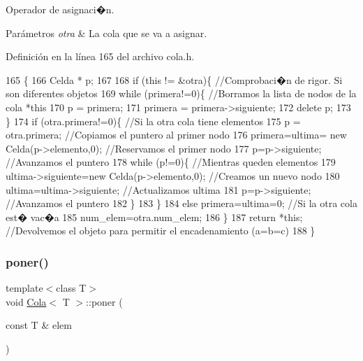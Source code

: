 Operador de asignaci�n. 


\begin{DoxyParams}{Parámetros}
{\em otra} & La cola que se va a asignar. \\
\hline
\end{DoxyParams}


Definición en la línea 165 del archivo cola.\+h.


\begin{DoxyCode}
165                                                \{
166   Celda * p;
167   
168   \textcolor{keywordflow}{if} (\textcolor{keyword}{this} != &otra)\{    \textcolor{comment}{//Comprobaci�n de rigor. Si son diferentes objetos}
169     \textcolor{keywordflow}{while} (primera!=0)\{  \textcolor{comment}{//Borramos la lista de nodos de la cola *this}
170       p = primera;
171       primera = primera->siguiente;
172       \textcolor{keyword}{delete} p;
173     \}
174     \textcolor{keywordflow}{if} (otra.primera!=0)\{        \textcolor{comment}{//Si la otra cola tiene elementos}
175       p = otra.primera;          \textcolor{comment}{//Copiamos el puntero al primer nodo}
176       primera=ultima= \textcolor{keyword}{new} Celda(p->elemento,0); \textcolor{comment}{//Reservamos el primer nodo}
177       p=p->siguiente;                           \textcolor{comment}{//Avanzamos el puntero}
178       \textcolor{keywordflow}{while} (p!=0)\{                             \textcolor{comment}{//Mientras queden elementos}
179         ultima->siguiente=\textcolor{keyword}{new} Celda(p->elemento,0); \textcolor{comment}{//Creamos un nuevo nodo}
180         ultima=ultima->siguiente;                   \textcolor{comment}{//Actualizamos ultima}
181         p=p->siguiente;                             \textcolor{comment}{//Avanzamos el puntero}
182       \}
183     \}
184     \textcolor{keywordflow}{else} primera=ultima=0;      \textcolor{comment}{//Si la otra cola est� vac�a}
185     num\_elem=otra.num\_elem;
186   \}
187   \textcolor{keywordflow}{return} *\textcolor{keyword}{this}; \textcolor{comment}{//Devolvemos el objeto para permitir el encadenamiento (a=b=c)}
188 \}
\end{DoxyCode}
\mbox{\label{classCola_a4a902e5805ae74f8d80c6f3267fd14c4}} 
\subsubsection{\texorpdfstring{poner()}{poner()}}
{\footnotesize\ttfamily template$<$class T$>$ \\
void \hyperlink{classCola}{Cola}$<$ T $>$\+::poner (\begin{DoxyParamCaption}\item[{const T \&}]{elem }\end{DoxyParamCaption})}



